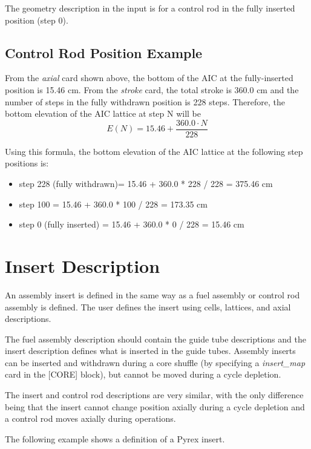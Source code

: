 The geometry description in the input is for a control rod in the fully inserted position (step 0).

\subsection{Control Rod Position Example}

From the {\it axial} card shown above, the bottom of the AIC at the fully-inserted position is 15.46 cm.
From the {\it stroke} card, the total stroke is 360.0 cm and the number of steps in the fully withdrawn
position is 228 steps.
Therefore, the bottom elevation of the AIC lattice at step N will be
\begin{equation}
   E(N) = 15.46 + \frac{360.0 \cdot N}{228}
\end{equation}

Using this formula, the bottom elevation of the AIC lattice at the following step positions is:
\begin{itemize}   %
 \item step 228 (fully withdrawn)= 15.46 + 360.0 * 228 / 228 = 375.46 cm
 \item step 100 = 15.46 + 360.0 * 100 / 228 = 173.35 cm
 \item step 0 (fully inserted) = 15.46 + 360.0 * 0 / 228 = 15.46 cm
\end{itemize}

\section{Insert Description}
An assembly insert is defined in the same way as a fuel assembly or control rod assembly is defined.
The user defines the insert using cells, lattices, and axial descriptions.

The fuel assembly description should contain the guide tube descriptions and the insert description
defines what is inserted in the guide tubes.  Assembly inserts can be inserted and withdrawn
during a core shuffle (by specifying a {\it insert\_map} card in the [CORE] block),
but cannot be moved during a cycle depletion.

The insert and control rod descriptions are very similar, with the only difference being that the
insert cannot change position axially during a cycle depletion and a control rod moves axially
during operations.

The following example shows a definition of a Pyrex insert.

